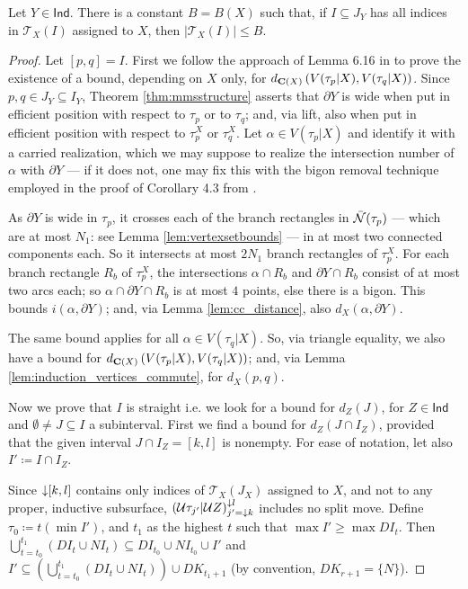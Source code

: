 \begin{lemma}\label{lem:mms616}
Let $Y\in\mathsf{Ind}$. There is a constant $B=B(X)$ such that, if $I\subseteq J_Y$ has all indices in $\mathcal T_X(I)$ assigned to $X$, then $|\mathcal T_X(I)|\leq B$.
\end{lemma}
\begin{proof}
Let $[p,q]=I$. First we follow the approach of Lemma 6.16 in \cite{mms} to prove the existence of a bound, depending on $X$ only, for $d_{\mathbf C(X)}\left(V(\tau_p|X),V(\tau_q|X)\right)$. Since $p,q\in J_Y\subseteq I_Y$, Theorem \ref{thm:mmsstructure} asserts that $\partial Y$ is wide when put in efficient position with respect to $\tau_p$ or to $\tau_q$; and, via lift, also when put in efficient position with respect to $\tau_p^X$ or $\tau_q^X$. Let $\alpha\in V(\tau_p|X)$ and identify it with a carried realization, which we may suppose to realize the intersection number of $\alpha$ with $\partial Y$ --- if it does not, one may fix this with the bigon removal technique employed in the proof of Corollary 4.3 from \cite{mms}. 

As $\partial Y$ is wide in $\tau_p$, it crosses each of the branch rectangles in $\bar{{\mathcal N}}(\tau_p)$ --- which are at most $N_1$: see Lemma \ref{lem:vertexsetbounds} --- in at most two connected components each. So it intersects at most $2N_1$ branch rectangles of $\tau_p^X$. For each branch rectangle $R_b$ of $\tau_p^X$, the intersections $\alpha\cap R_b$ and $\partial Y\cap R_b$ consist of at most two arcs each; so $\alpha\cap\partial Y\cap R_b$ is at most $4$ points, else there is a bigon. This bounds $i\left(\alpha,\partial Y\right)$; and, via Lemma \ref{lem:cc_distance}, also $d_X\left(\alpha,\partial Y\right)$.

The same bound applies for all $\alpha\in V(\tau_q|X)$. So, via triangle equality, we also have a bound for $d_{\mathbf C(X)}\left(V(\tau_p| X),V(\tau_q|X)\right)$; and, via Lemma \ref{lem:induction_vertices_commute}, for $d_X(p, q)$.

Now we prove that $I$ is straight i.e. we look for a bound for $d_Z\left(J\right)$, for $Z\in \mathsf{Ind}$ and $\emptyset\not=J\subseteq I$ a subinterval. First we find a bound for $d_Z(J\cap I_Z)$, provided that the given interval $J\cap I_Z=[k,l]$ is nonempty. For ease of notation, let also $I'\coloneqq I\cap I_Z$.

Since $\mathord{\downarrow} [k,l]$ contains only indices of $\mathcal T_X(J_X)$ assigned to $X$, and not to any proper, inductive subsurface, $({\mathcal U}\tau_{j'}|{\mathcal U} Z)_{j'=\mathord{\downarrow} k}^{\mathord{\downarrow} l}$ includes no split move. Define $\tau_0\coloneqq t(\min I')$, and $t_1$ as the highest $t$ such that $\max I' \geq \max DI_t$. Then $\bigcup_{t=t_0}^{t_1} (DI_t\cup NI_t)\subseteq DI_{t_0}\cup NI_{t_0}\cup I'$ and $I'\subseteq \left(\bigcup_{t=t_0}^{t_1} (DI_t\cup NI_t)\right)\cup DK_{t_1+1}$ (by convention, $DK_{r+1}=\{N\}$).


\end{proof}
